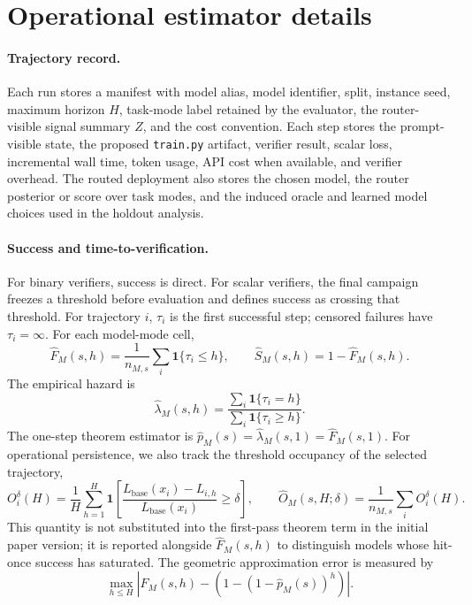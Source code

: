 \documentclass{article}
\begin{document}
\section{Operational estimator details}
\label{app:experiment-details}

\paragraph{Trajectory record.}
Each run stores a manifest with model alias, model identifier, split, instance seed, maximum horizon $H$, task-mode label retained by the evaluator, the router-visible signal summary $Z$, and the cost convention.
Each step stores the prompt-visible state, the proposed \texttt{train.py} artifact, verifier result, scalar loss, incremental wall time, token usage, API cost when available, and verifier overhead.
The routed deployment also stores the chosen model, the router posterior or score over task modes, and the induced oracle and learned model choices used in the holdout analysis.

\paragraph{Success and time-to-verification.}
For binary verifiers, success is direct.
For scalar verifiers, the final campaign freezes a threshold before evaluation and defines success as crossing that threshold.
For trajectory $i$, $\tau_i$ is the first successful step; censored failures have $\tau_i=\infty$.
For each model-mode cell,
\[
  \hat F_M(s,h)=\frac{1}{n_{M,s}}\sum_i\mathbf{1}\{\tau_i\le h\},
  \qquad
  \hat S_M(s,h)=1-\hat F_M(s,h).
\]
The empirical hazard is
\[
  \hat\lambda_M(s,h)=
  \frac{\sum_i\mathbf{1}\{\tau_i=h\}}
       {\sum_i\mathbf{1}\{\tau_i\ge h\}} .
\]
The one-step theorem estimator is $\hat p_M(s)=\hat\lambda_M(s,1)=\hat F_M(s,1)$.
For operational persistence, we also track the threshold occupancy of the selected trajectory,
\[
  O_i^{\delta}(H)=\frac{1}{H}\sum_{h=1}^{H}\mathbf{1}\!\left[\frac{L_{\mathrm{base}}(x_i)-L_{i,h}}{L_{\mathrm{base}}(x_i)}\ge \delta\right],
  \qquad
  \hat O_M(s,H;\delta)=\frac{1}{n_{M,s}}\sum_i O_i^{\delta}(H).
\]
This quantity is not substituted into the first-pass theorem term in the initial paper version; it is reported alongside $\hat F_M(s,h)$ to distinguish models whose hit-once success has saturated.
The geometric approximation error is measured by
\[
  \max_{h\le H}\left|
    \hat F_M(s,h)-\left(1-(1-\hat p_M(s))^h\right)
  \right|.
\]
\end{document}
